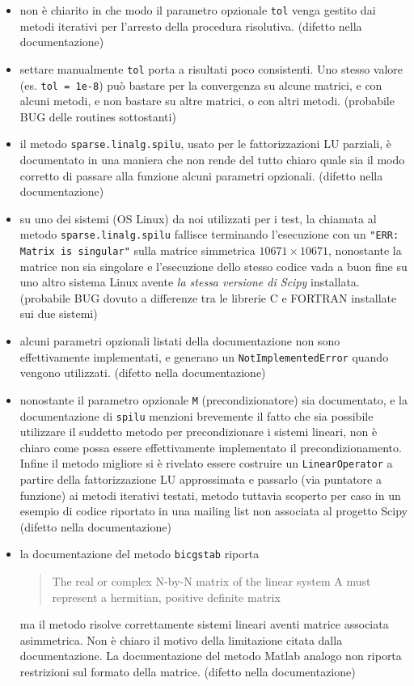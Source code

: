 \documentclass[11pt,a4paper]{scrartcl}
\begin{document}
\begin{itemize}
\item non è chiarito in che modo il parametro opzionale \texttt{tol} venga gestito dai metodi iterativi per l'arresto della procedura risolutiva. (\textsf{difetto nella documentazione})
\item settare manualmente \texttt{tol} porta a risultati poco consistenti. Uno stesso valore (es. \texttt{tol = 1e-8}) può bastare per la convergenza su alcune matrici, e con alcuni metodi, e non bastare su altre matrici, o con altri metodi. (\textsf{probabile BUG delle routines sottostanti})
\item il metodo \texttt{sparse.linalg.spilu}, usato per le fattorizzazioni LU parziali, è documentato in una maniera che non rende del tutto chiaro quale sia il modo corretto di passare alla funzione alcuni parametri opzionali. (\textsf{difetto nella documentazione})
\item su uno dei sistemi (OS Linux) da noi utilizzati per i test, la chiamata al metodo \texttt{sparse.linalg.spilu} fallisce terminando l'esecuzione con un \texttt{"ERR: Matrix is singular"} sulla matrice simmetrica $10671\times10671$, nonostante la matrice non sia singolare e l'esecuzione dello stesso codice vada a buon fine su uno altro sistema Linux avente \emph{la stessa versione di Scipy} installata. (\textsf{probabile BUG dovuto a differenze tra le librerie C e FORTRAN installate sui due sistemi})
\item alcuni parametri opzionali listati della documentazione non sono effettivamente implementati, e generano  un \texttt{NotImplementedError} quando vengono utilizzati. (\textsf{difetto nella documentazione})
\item nonostante il parametro opzionale \texttt{M} (precondizionatore) sia documentato, e la documentazione di \texttt{spilu} menzioni brevemente il fatto che sia possibile utilizzare il suddetto metodo per precondizionare i sistemi lineari, non è chiaro come possa essere effettivamente implementato il precondizionamento. Infine il metodo migliore si è rivelato essere costruire un \texttt{LinearOperator} a partire della fattorizzazione LU approssimata e passarlo (via puntatore a funzione) ai metodi iterativi testati, metodo tuttavia scoperto per caso in un esempio di codice riportato in una mailing list non associata al progetto Scipy (\textsf{difetto nella documentazione})
\item la documentazione del metodo \texttt{bicgstab} riporta
\begin{quote}
The real or complex N-by-N matrix of the linear system A must represent a hermitian, positive definite matrix
\end{quote}
ma il metodo risolve correttamente sistemi lineari aventi matrice associata asimmetrica. Non è chiaro il motivo della limitazione citata dalla documentazione. La documentazione del metodo Matlab analogo non riporta restrizioni sul formato della matrice. (\textsf{difetto nella documentazione})
\end{itemize}
\end{document}
